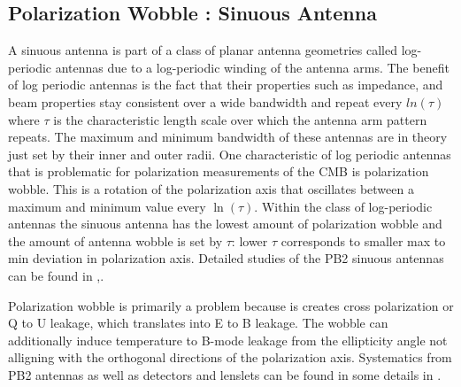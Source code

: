 \subsection{Polarization Wobble : Sinuous Antenna}

A sinuous antenna is part of a class of planar antenna geometries called log-periodic antennas due to a log-periodic winding of the antenna arms. The benefit of log periodic antennas is the fact that their properties such as impedance, and beam properties stay consistent over a wide bandwidth and repeat every $ln(\tau)$ where $\tau$ is the characteristic length scale over which the antenna arm pattern repeats. The maximum and minimum bandwidth of these antennas are in theory just set by their inner and outer radii. One characteristic of log periodic antennas that is problematic for polarization measurements of the CMB is polarization wobble. This is a rotation of the polarization axis that oscillates between a maximum and minimum value every $\ln(\tau)$. Within the class of log-periodic antennas the sinuous antenna has the lowest amount of polarization wobble and the amount of antenna wobble is set by $\tau$: lower $\tau$ corresponds to smaller max to min deviation in polarization axis. Detailed studies of the PB2 sinuous antennas can be found in \cite{Obrient2008},\cite{Edwards2012}.


Polarization wobble is primarily a problem because is creates cross polarization or Q to U leakage, which translates into E to B leakage. The wobble can additionally induce temperature to B-mode leakage from the ellipticity angle not alligning with the orthogonal directions of the polarization axis. Systematics from PB2 antennas as well as detectors and lenslets can be found in some details in \cite{TokiThesis}.

